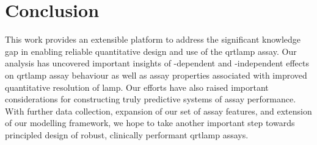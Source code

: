 \documentclass[../thesis.tex]{subfiles}
\begin{document}



%
%






\section{Conclusion}

This work provides an extensible platform to address the significant knowledge gap in enabling reliable quantitative design and use of the \gls{qrtlamp} assay. 
Our analysis has uncovered important insights of -dependent and -independent effects on \gls{qrtlamp} assay behaviour as well as assay properties associated with improved quantitative resolution of \gls{lamp}. Our efforts have also raised important considerations for constructing truly predictive systems of assay performance. With further data collection, expansion of our set of assay features, and extension of our modelling framework, we hope to take another important step towards principled design of robust, clinically performant \gls{qrtlamp} assays. 





\dobib %
\end{document}
